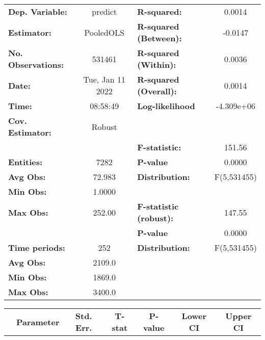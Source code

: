 \begin{center}
\begin{tabular}{lclc}
\toprule
\textbf{Dep. Variable:}    &      predict       & \textbf{  R-squared:         }   &      0.0014      \\
\textbf{Estimator:}        &     PooledOLS      & \textbf{  R-squared (Between):}  &     -0.0147      \\
\textbf{No. Observations:} &       531461       & \textbf{  R-squared (Within):}   &      0.0036      \\
\textbf{Date:}             &  Tue, Jan 11 2022  & \textbf{  R-squared (Overall):}  &      0.0014      \\
\textbf{Time:}             &      08:58:49      & \textbf{  Log-likelihood     }   &    -4.309e+06    \\
\textbf{Cov. Estimator:}   &       Robust       & \textbf{                     }   &                  \\
\textbf{}                  &                    & \textbf{  F-statistic:       }   &      151.56      \\
\textbf{Entities:}         &        7282        & \textbf{  P-value            }   &      0.0000      \\
\textbf{Avg Obs:}          &       72.983       & \textbf{  Distribution:      }   &   F(5,531455)    \\
\textbf{Min Obs:}          &       1.0000       & \textbf{                     }   &                  \\
\textbf{Max Obs:}          &       252.00       & \textbf{  F-statistic (robust):} &      147.55      \\
\textbf{}                  &                    & \textbf{  P-value            }   &      0.0000      \\
\textbf{Time periods:}     &        252         & \textbf{  Distribution:      }   &   F(5,531455)    \\
\textbf{Avg Obs:}          &       2109.0       & \textbf{                     }   &                  \\
\textbf{Min Obs:}          &       1869.0       & \textbf{                     }   &                  \\
\textbf{Max Obs:}          &       3400.0       & \textbf{                     }   &                  \\
\bottomrule
\end{tabular}
\begin{tabular}{lcccccc}
                & \textbf{Parameter} & \textbf{Std. Err.} & \textbf{T-stat} & \textbf{P-value} & \textbf{Lower CI} & \textbf{Upper CI}  \\

\end{tabular}
\end{center}
